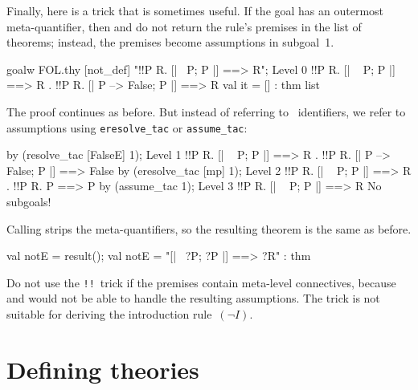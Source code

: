 \goodbreak\medskip{}
Finally, here is a trick that is sometimes useful.  If the goal
has an outermost meta-quantifier, then  and 
do not return the rule's premises in the list of theorems;  instead, the
premises become assumptions in subgoal~1.  
\begin{ttbox}
goalw FOL.thy [not_def] "!!P R. [| ~P;  P |] ==> R";
{\out Level 0}
{\out !!P R. [| ~ P; P |] ==> R}
{. !!P R. [| P --> False; P |] ==> R}
val it = [] : thm list
\end{ttbox}
The proof continues as before.  But instead of referring to \ML\
identifiers, we refer to assumptions using {\tt eresolve_tac} or
{\tt assume_tac}: 
\begin{ttbox}
by (resolve_tac [FalseE] 1);
{\out Level 1}
{\out !!P R. [| ~ P; P |] ==> R}
{. !!P R. [| P --> False; P |] ==> False}
\ttbreak
by (eresolve_tac [mp] 1);
{\out Level 2}
{\out !!P R. [| ~ P; P |] ==> R}
{. !!P R. P ==> P}
\ttbreak
by (assume_tac 1);
{\out Level 3}
{\out !!P R. [| ~ P; P |] ==> R}
{\out No subgoals!}
\end{ttbox}
Calling  strips the meta-quantifiers, so the resulting
theorem is the same as before.
\begin{ttbox}
val notE = result();
{\out val notE = "[| ~?P; ?P |] ==> ?R" : thm}
\end{ttbox}
Do not use the {\tt!!}\ trick if the premises contain meta-level
connectives, because \ttindex{eresolve_tac} and  would
not be able to handle the resulting assumptions.  The trick is not suitable
for deriving the introduction rule~$(\neg I)$.


\section{Defining theories}\label{sec:defining-theories}

